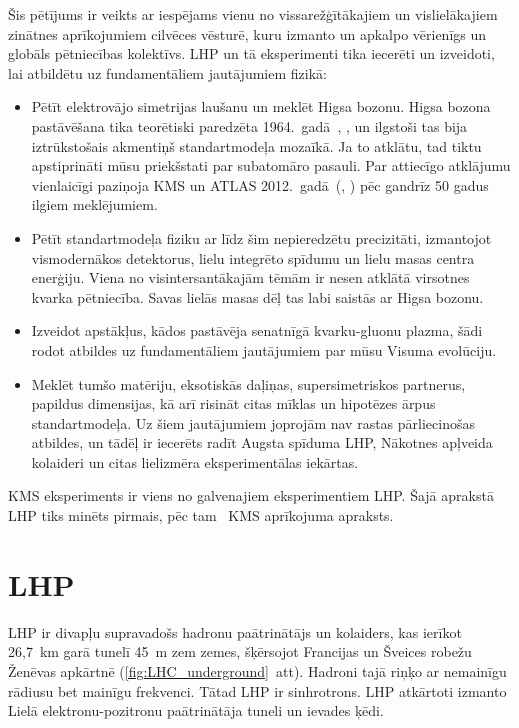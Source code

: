 \label{sec:experimental_setup}

Šis pētījums ir veikts ar iespējams vienu no vissarežģītākajiem un vislielākajiem zinātnes aprīkojumiem cilvēces vēsturē, kuru izmanto un apkalpo vērienīgs un globāls pētniecības kolektīvs. LHP un tā eksperimenti tika iecerēti un izveidoti, lai atbildētu uz fundamentāliem jautājumiem fizikā:

\begin{itemize}
\item Pētīt elektrovājo simetrijas laušanu un meklēt Higsa bozonu. Higsa bozona pastāvēšana tika teorētiski paredzēta 1964.~gadā~\cite{Higgs:1964ia}, \cite{Englert:1964et}, un ilgstoši tas bija iztrūkstošais akmentiņš standartmodeļa mozaīkā. Ja to atklātu, tad tiktu apstiprināti mūsu priekšstati par subatomāro pasauli. Par attiecīgo atklājumu vienlaicīgi paziņoja KMS un ATLAS 2012.~gadā~(\cite{Chatrchyan:2012xdj}, \cite{Aad:2012tfa}) pēc gandrīz 50 gadus ilgiem meklējumiem.
\item Pētīt standartmodeļa fiziku ar līdz šim nepieredzētu precizitāti, izmantojot vismodernākos detektorus, lielu integrēto spīdumu un lielu masas centra enerģiju. Viena no visintersantākajām tēmām ir nesen atklātā virsotnes kvarka pētniecība. Savas lielās masas dēļ tas labi saistās ar Higsa bozonu.
\item Izveidot apstākļus, kādos pastāvēja senatnīgā kvarku-gluonu plazma, šādi rodot atbildes uz fundamentāliem jautājumiem par mūsu Visuma evolūciju.
\item Meklēt tumšo matēriju, eksotiskās daļiņas, supersimetriskos partnerus, \gls{papildus dimensijas}, kā arī risināt citas mīklas un hipotēzes ārpus standartmodeļa. Uz šiem jautājumiem joprojām nav rastas pārliecinošas atbildes, un tādēļ ir iecerēts radīt \gls{Augsta spīduma LHP}, \gls{Nākotnes apļveida kolaideri} un citas lielizmēra eksperimentālas iekārtas. 
\end {itemize}

KMS eksperiments ir viens no galvenajiem eksperimentiem LHP. Šajā aprakstā LHP tiks minēts pirmais, pēc tam \textendash\ KMS aprīkojuma apraksts.

\section{LHP}

LHP ir divapļu supravadošs hadronu paātrinātājs un kolaiders, kas ierīkot 26,7~km garā tunelī 45~m zem zemes, šķērsojot Francijas un Šveices robežu Ženēvas apkārtnē (\ref{fig:LHC_underground}~att). Hadroni tajā riņķo ar nemainīgu rādiusu bet mainīgu frekvenci. Tātad LHP ir sinhrotrons. LHP atkārtoti izmanto Lielā elektronu-pozitronu paātrinātāja tuneli un \gls{ievades ķēdi}.

